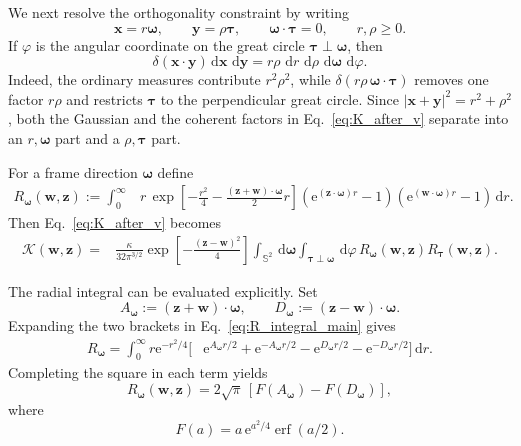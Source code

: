 \documentclass[11pt]{article}
\numberwithin{equation}{section}
\newcommand{\Sph}{\mathbb S}
\newcommand{\dd}{\,\mathrm d}
\newcommand{\e}{\mathrm e}
\theoremstyle{definition}
\begin{document}
We next resolve the orthogonality constraint by writing
\begin{equation}
 \bm x=r\bm\omega,\qquad
 \bm y=\rho\bm\tau,\qquad
 \bm\omega\cdot\bm\tau=0,
 \qquad r,\rho\ge0.
 \label{eq:Carleman_frame_param}
\end{equation}
If $\varphi$ is the angular coordinate on the great circle
$\bm\tau\perp\bm\omega$, then
\begin{equation}
 \delta(\bm x\cdot\bm y)\dd\bm x\,\dd\bm y
 =r\rho\,\dd r\,\dd\rho\,\dd\bm\omega\,\dd\varphi.
 \label{eq:carleman_radial_measure}
\end{equation}
Indeed, the ordinary measures contribute $r^2\rho^2$, while
$\delta(r\rho\,\bm\omega\cdot\bm\tau)$ removes one factor $r\rho$
and restricts $\bm\tau$ to the perpendicular great circle.  Since
$|\bm x+\bm y|^2=r^2+\rho^2$, both the Gaussian and the coherent factors in
Eq.~\eqref{eq:K_after_v} separate into an $r,\bm\omega$ part and a
$\rho,\bm\tau$ part.

For a frame direction $\bm\omega$ define
\begin{align}
 R_{\bm\omega}(\bm w,\bm z)
 :=\int_0^\infty &r\,
 \exp\!\left[-\frac{r^2}{4}
 -\frac{(\bm z+\bm w)\cdot\bm\omega}{2}r\right]
 \left(\e^{(\bm z\cdot\bm\omega)r}-1\right)
 \left(\e^{(\bm w\cdot\bm\omega)r}-1\right)\dd r.
 \label{eq:R_integral_main}
\end{align}
Then Eq.~\eqref{eq:K_after_v} becomes
\begin{align}
 \mathcal K(\bm w,\bm z)
 ={}&
 \frac{\kappa}{32\pi^{3/2}}
 \exp\!\left[-\frac{(\bm z-\bm w)^2}{4}\right]
 \int_{\Sph^2}\dd\bm\omega
 \int_{\bm\tau\perp\bm\omega}\dd\varphi\,
 R_{\bm\omega}(\bm w,\bm z)
 R_{\bm\tau}(\bm w,\bm z).
 \label{eq:K_frame_before_average}
\end{align}

The radial integral can be evaluated explicitly.  Set
\begin{equation}
 A_{\bm\omega}:=(\bm z+\bm w)\cdot\bm\omega,
 \qquad
 D_{\bm\omega}:=(\bm z-\bm w)\cdot\bm\omega.
\end{equation}
Expanding the two brackets in Eq.~\eqref{eq:R_integral_main} gives
\begin{align}
 R_{\bm\omega}
 =\int_0^\infty r\e^{-r^2/4}
 \big[&\e^{A_{\bm\omega}r/2}+\e^{-A_{\bm\omega}r/2}
 -\e^{D_{\bm\omega}r/2}-\e^{-D_{\bm\omega}r/2}\big]\dd r.
 \label{eq:R_four_exponentials}
\end{align}
Completing the square in each term yields
\begin{equation}
 R_{\bm\omega}(\bm w,\bm z)
 =2\sqrt\pi\,[F(A_{\bm\omega})-F(D_{\bm\omega})],
 \label{eq:Rclosed}
\end{equation}
where
\begin{equation}
 F(a)=a\,\e^{a^2/4}\operatorname{erf}(a/2).
 \label{eq:Fdef}
\end{equation}
\end{document}
